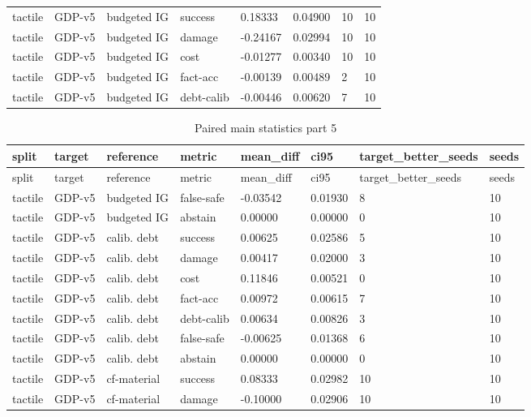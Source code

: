 \documentclass{article}
\begin{document}
\begin{center}
\begin{longtable}{llllllll}
tactile & GDP-v5 & budgeted IG & success & 0.18333 & 0.04900 & 10 & 10 \\
tactile & GDP-v5 & budgeted IG & damage & -0.24167 & 0.02994 & 10 & 10 \\
tactile & GDP-v5 & budgeted IG & cost & -0.01277 & 0.00340 & 10 & 10 \\
tactile & GDP-v5 & budgeted IG & fact-acc & -0.00139 & 0.00489 & 2 & 10 \\
tactile & GDP-v5 & budgeted IG & debt-calib & -0.00446 & 0.00620 & 7 & 10 \\
\bottomrule
\end{longtable}
\renewcommand{\arraystretch}{1.0}
\end{center}


\begin{center}
\tiny
\renewcommand{\arraystretch}{0.92}
\setlength{\tabcolsep}{3pt}
\begin{longtable}{llllllll}
\caption{Paired main statistics part 5}\label{tab:paired-main-statistics-5}\\
\toprule
split & target & reference & metric & mean\_diff & ci95 & target\_better\_seeds & seeds \\
\midrule
\endfirsthead
\toprule
split & target & reference & metric & mean\_diff & ci95 & target\_better\_seeds & seeds \\
\midrule
\endhead
tactile & GDP-v5 & budgeted IG & false-safe & -0.03542 & 0.01930 & 8 & 10 \\
tactile & GDP-v5 & budgeted IG & abstain & 0.00000 & 0.00000 & 0 & 10 \\
tactile & GDP-v5 & calib. debt & success & 0.00625 & 0.02586 & 5 & 10 \\
tactile & GDP-v5 & calib. debt & damage & 0.00417 & 0.02000 & 3 & 10 \\
tactile & GDP-v5 & calib. debt & cost & 0.11846 & 0.00521 & 0 & 10 \\
tactile & GDP-v5 & calib. debt & fact-acc & 0.00972 & 0.00615 & 7 & 10 \\
tactile & GDP-v5 & calib. debt & debt-calib & 0.00634 & 0.00826 & 3 & 10 \\
tactile & GDP-v5 & calib. debt & false-safe & -0.00625 & 0.01368 & 6 & 10 \\
tactile & GDP-v5 & calib. debt & abstain & 0.00000 & 0.00000 & 0 & 10 \\
tactile & GDP-v5 & cf-material & success & 0.08333 & 0.02982 & 10 & 10 \\
tactile & GDP-v5 & cf-material & damage & -0.10000 & 0.02906 & 10 & 10 \\

\end{longtable}
\end{center}
\end{document}
